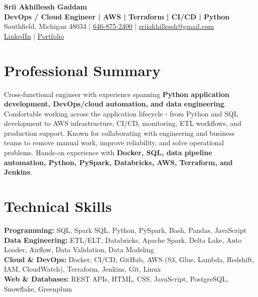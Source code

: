 \documentclass[letterpaper,10pt]{article}
\begin{document}
\fontsize{9.35pt}{10.45pt}\selectfont

\begin{center}
    {\LARGE \textbf{Srii Akhillessh Gaddam}} \\[-1pt]
    \textbf{DevOps / Cloud Engineer | AWS | Terraform | CI/CD | Python} \\[2pt]
    Southfield, Michigan 48034 $|$
    \href{tel:6468752400}{646-875-2400} $|$
    \href{mailto:sriiakhillessh@gmail.com}{sriiakhillessh@gmail.com} \\[1pt]
    \href{https://www.linkedin.com/in/srii-akhiilessh-gaddam-b48668191/}{LinkedIn} $|$
    \href{https://sriiakhillesshg.github.io/portfolio/}{Portfolio}
\end{center}
\vspace{-8pt}

\section{Professional Summary}
\small{Cross-functional engineer with experience spanning \textbf{Python application development, DevOps/cloud automation, and data engineering}. Comfortable working across the application lifecycle - from Python and SQL development to AWS infrastructure, CI/CD, monitoring, ETL workflows, and production support. Known for collaborating with engineering and business teams to remove manual work, improve reliability, and solve operational problems. Hands-on experience with \textbf{Docker, SQL, data pipeline automation, Python, PySpark, Databricks, AWS, Terraform, and Jenkins}.}

\section{Technical Skills}
\small{
\textbf{Programming:} SQL, Spark SQL, Python, PySpark, Bash, Pandas, JavaScript \\
\textbf{Data Engineering:} ETL/ELT, Databricks, Apache Spark, Delta Lake, Auto Loader, Airflow, Data Validation, Data Modeling \\
\textbf{Cloud \& DevOps:} Docker, CI/CD, GitHub, AWS (S3, Glue, Lambda, Redshift, IAM, CloudWatch), Terraform, Jenkins, Git, Linux \\
\textbf{Web \& Databases:} REST APIs, HTML, CSS, JavaScript, PostgreSQL, Snowflake, Greenplum
}
\end{document}
